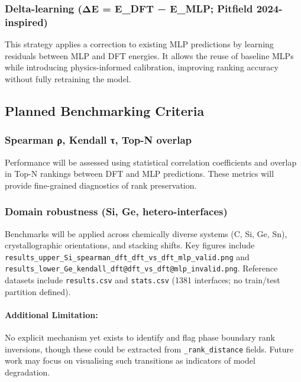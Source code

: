 \subsubsection{Delta-learning (ΔE = E\_DFT − E\_MLP; Pitfield 2024-inspired)}

This strategy applies a correction to existing MLP predictions by learning residuals between MLP and DFT energies. It allows the reuse of baseline MLPs while introducing physics-informed calibration, improving ranking accuracy without fully retraining the model.


\subsection{Planned Benchmarking Criteria}

\subsubsection{Spearman ρ, Kendall τ, Top-N overlap}

Performance will be assessed using statistical correlation coefficients and overlap in Top-N rankings between DFT and MLP predictions. These metrics will provide fine-grained diagnostics of rank preservation.


\subsubsection{Domain robustness (Si, Ge, hetero-interfaces)}

Benchmarks will be applied across chemically diverse systems (C, Si, Ge, Sn), crystallographic orientations, and stacking shifts. Key figures include \texttt{results\_upper\_Si\_spearman\_dft\_dft\_vs\_dft\_mlp\_valid.png} and \texttt{results\_lower\_Ge\_kendall\_dft@dft\_vs\_dft@mlp\_invalid.png}. Reference datasets include \texttt{results.csv} and \texttt{stats.csv} (1381 interfaces; no train/test partition defined).

\paragraph{Additional Limitation:}

No explicit mechanism yet exists to identify and flag phase boundary rank inversions, though these could be extracted from \texttt{\_rank\_distance} fields. Future work may focus on visualising such transitions as indicators of model degradation.

